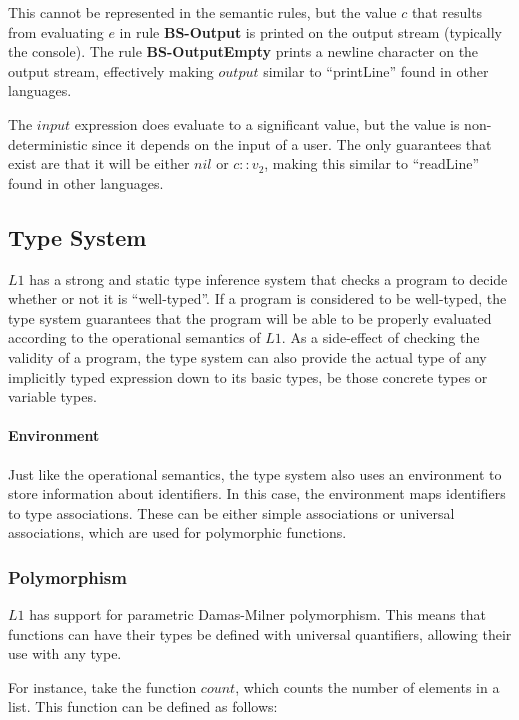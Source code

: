 \documentclass{article}
\begin{document}
This cannot be represented in the semantic rules, but the value $c$ that results from evaluating $e$ in rule \textbf{BS-Output} is printed on the output stream (typically the console).
The rule \textbf{BS-OutputEmpty} prints a newline character on the output stream, effectively making $output$ similar to "`printLine"' found in other languages.

The $input$ expression does evaluate to a significant value, but the value is non-deterministic since it depends on the input of a user.
The only guarantees that exist are that it will be either $nil$ or $c :: v_2$, making this similar to "`readLine"' found in other languages.


\subsection{Type System}\label{Type System}
    
$L1$ has a strong and static type inference system that checks a program to decide whether or not it is "`well-typed"'.
If a program is considered to be well-typed, the type system guarantees that the program will be able to be properly evaluated according to the operational semantics of $L1$. 
As a side-effect of checking the validity of a program, the type system can also provide the actual type of any implicitly typed expression down to its basic types, be those concrete types or variable types.

\paragraph{Environment}
Just like the operational semantics, the type system also uses an environment to store information about identifiers.
In this case, the environment maps identifiers to type associations. 
These can be either simple associations or universal associations, which are used for polymorphic functions.

\subsubsection{Polymorphism}\label{Polymorphism}

$L1$ has support for parametric Damas\hyp Milner polymorphism.
This means that functions can have their types be defined with universal quantifiers, allowing their use with any type.

For instance, take the function $count$, which counts the number of elements in a list.
This function can be defined as follows:
\end{document}

